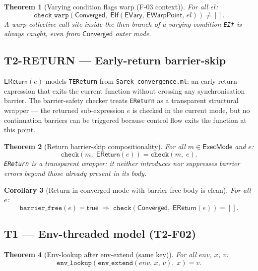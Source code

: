 \documentclass[11pt,a4paper]{article}
\theoremstyle{definition}
\theoremstyle{plain}
\newtheorem{theorem}{Theorem}[section]
\newtheorem{corollary}[theorem]{Corollary}
\theoremstyle{remark}
\newcommand{\Converged}{\mathsf{Converged}}
\newcommand{\barrierfree}[1]{\mathtt{barrier\_free}(#1)}
\begin{document}
\begin{theorem}[Varying condition flags warp (F-03 context)]
  \label{thm:warp-varying-if-flags}
  For all $\mathit{el}$:
  \[
    \mathtt{check\_warp}(\Converged,\;\mathsf{EIf}(\mathsf{EVary},\,\mathsf{EWarpPoint},\,\mathit{el})) \ne [].
  \]
  A warp-collective call site inside the then-branch of a varying-condition
  \texttt{EIf} is always caught, even from $\Converged$ outer mode.
\end{theorem}

\subsection{T2-RETURN --- Early-return barrier-skip}
\label{sec:return-props}

$\mathsf{EReturn}(e)$ models \texttt{TEReturn} from \texttt{Sarek\_convergence.ml}:
an early-return expression that exits the current function without crossing any
synchronisation barrier. The barrier-safety checker treats \texttt{EReturn} as
a transparent structural wrapper — the returned sub-expression $e$ is checked
in the current mode, but no continuation barriers can be triggered because
control flow exits the function at this point.

\begin{theorem}[Return barrier-skip compositionality]
  \label{thm:return-barrier-skip-safe}
  For all $m \in \mathsf{ExecMode}$ and $e$:
  \[
    \mathtt{check}(m,\;\mathsf{EReturn}(e)) = \mathtt{check}(m,\;e).
  \]
  \texttt{EReturn} is a transparent wrapper: it neither introduces nor
  suppresses barrier errors beyond those already present in its body.
\end{theorem}

\begin{corollary}[Return in converged mode with barrier-free body is clean]
  \label{cor:return-converged-clean}
  For all $e$:
  \[
    \barrierfree{e} = \mathsf{true}
    \;\Rightarrow\;
    \mathtt{check}(\Converged,\;\mathsf{EReturn}(e)) = [].
  \]
\end{corollary}

\subsection{T1 --- Env-threaded model (T2-F02)}
\label{sec:envthreaded-props}

\begin{theorem}[Env-lookup after env-extend (same key)]
  \label{thm:env-lookup-extend-same}
  For all $\mathit{env}$, $x$, $v$:
  \[
    \mathtt{env\_lookup}(\mathtt{env\_extend}(\mathit{env},\,x,\,v),\;x) = v.
  \]
\end{theorem}
\end{document}
